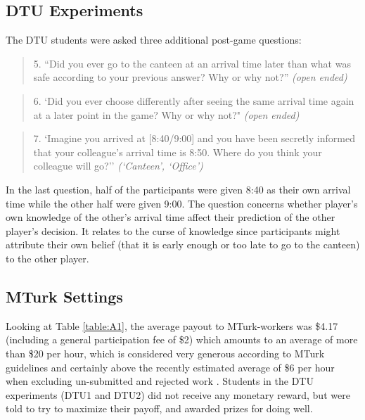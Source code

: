 \documentclass[a4paper,superscriptaddress,nofootinbib]{revtex4}
\begin{document}
\subsection{DTU Experiments}
The DTU students were asked three additional post-game questions:
\begin{quote}
5. ``Did you ever go to the canteen at an arrival time later than what was safe according
to your previous answer? Why or why not?'' \textit{(open ended)}
\end{quote}
\begin{quote}
6. `Did you ever choose differently after seeing the same arrival time again at a later point
in the game? Why or why not?" \textit{(open ended)}
\end{quote}
\begin{quote}
7. `Imagine you arrived at [8:40/9:00] and you have been secretly informed that your colleague’s arrival time is 8:50. Where do you think your colleague will go?'' \textit{(`Canteen', `Office')}
\end{quote}
In the last question, half of the participants were given 8:40 as their own arrival time while the other half were given 9:00. The question concerns whether player’s own knowledge of the other’s arrival time affect their prediction of the other player’s decision. It relates to the curse of knowledge \cite{birch2007curse} since participants might attribute their own belief (that it is early enough or too late to go to the canteen) to the other player.

\subsection{MTurk Settings}
\label{MTurksettings}
Looking at Table \ref{table:A1}, the average payout to MTurk-workers was \$4.17 (including a general participation fee of \$2) which amounts to an average of more than \$20 per hour, which is considered very generous according to MTurk guidelines and certainly above the recently estimated average of \$6 per hour when excluding un-submitted and rejected work \cite{HaraEtAl18}. Students in the DTU experiments (DTU1 and DTU2) did not receive any monetary reward, but were told to try to maximize their payoff, and awarded prizes for doing well.
\end{document}
